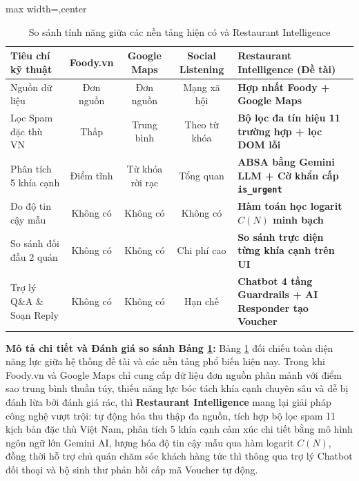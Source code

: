 \documentclass[12pt, a4paper]{article}
\begin{document}
\begin{table}[!htbp]
\centering
\caption{So sánh tính năng giữa các nền tảng hiện có và Restaurant Intelligence}\label{tab:comp_platforms}
\vspace{0.15cm}
\footnotesize
\begin{adjustbox}{max width=\textwidth,center}
\begin{tabularx}{0.97\textwidth}{l c c c X}
\toprule
\rowcolor{blue!8}
\textbf{Tiêu chí kỹ thuật} & \textbf{Foody.vn} & \textbf{Google Maps} & \textbf{Social Listening} & \textbf{Restaurant Intelligence (Đề tài)} \\
\midrule
Nguồn dữ liệu & Đơn nguồn & Đơn nguồn & Mạng xã hội & \textbf{Hợp nhất Foody + Google Maps} \\
\addlinespace
Lọc Spam đặc thù VN & Thấp & Trung bình & Theo từ khóa & \textbf{Bộ lọc đa tín hiệu 11 trường hợp + lọc DOM lỗi} \\
\addlinespace
Phân tích 5 khía cạnh & Điểm tĩnh & Từ khóa rời rạc & Tổng quan & \textbf{ABSA bằng Gemini LLM + Cờ khẩn cấp \texttt{is\_urgent}} \\
\addlinespace
Đo độ tin cậy mẫu & Không có & Không có & Không có & \textbf{Hàm toán học logarit $C(N)$ minh bạch} \\
\addlinespace
So sánh đối đầu 2 quán & Không có & Không có & Chi phí cao & \textbf{So sánh trực diện từng khía cạnh trên UI} \\
\addlinespace
Trợ lý Q\&A \& Soạn Reply & Không có & Không có & Hạn chế & \textbf{Chatbot 4 tầng Guardrails + AI Responder tạo Voucher} \\
\bottomrule
\end{tabularx}
\end{adjustbox}
\end{table}

\textbf{Mô tả chi tiết và Đánh giá so sánh Bảng \ref{tab:comp_platforms}:} Bảng \ref{tab:comp_platforms} đối chiếu toàn diện năng lực giữa hệ thống đề tài và các nền tảng phổ biến hiện nay. Trong khi Foody.vn và Google Maps chỉ cung cấp dữ liệu đơn nguồn phân mảnh với điểm sao trung bình thuần túy, thiếu năng lực bóc tách khía cạnh chuyên sâu và dễ bị đánh lừa bởi đánh giá rác, thì \textbf{Restaurant Intelligence} mang lại giải pháp công nghệ vượt trội: tự động hóa thu thập đa nguồn, tích hợp bộ lọc spam 11 kịch bản đặc thù Việt Nam, phân tích 5 khía cạnh cảm xúc chi tiết bằng mô hình ngôn ngữ lớn Gemini AI, lượng hóa độ tin cậy mẫu qua hàm logarit $C(N)$, đồng thời hỗ trợ chủ quán chăm sóc khách hàng tức thì thông qua trợ lý Chatbot đối thoại và bộ sinh thư phản hồi cấp mã Voucher tự động.
\end{document}
